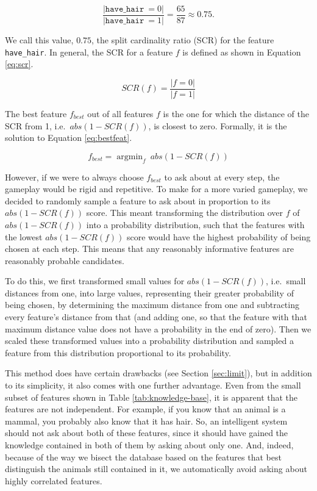 \documentclass[11pt,a4paper]{article}
\DeclareMathOperator*{\argmin}{argmin}
\newcommand{\havehair}{\texttt{have\_hair}}
\begin{document}
$$\frac{|\havehair\ = 0|}{|\havehair\ = 1|} = \frac{65}{87} \approx 0.75.$$

We call this value, $0.75$, the split cardinality ratio (SCR) for the feature \havehair.
In general, the SCR for a feature $f$ is defined as shown in Equation \ref{eq:scr}.

\begin{equation}
SCR(f) = \frac{|f = 0|}{|f = 1|} 
\label{eq:scr}
\end{equation}

The best feature $f_{best}$ out of all features $f$ is the one for which the distance of the SCR from 1, i.e.\ $abs(1 - SCR(f))$, is closest to zero.
Formally, it is the solution to Equation \ref{eq:bestfeat}.

\begin{equation}
f_{best} = \argmin_f\ abs(1 - SCR(f)) 
\label{eq:bestfeat}
\end{equation}

However, if we were to always choose $f_{best}$ to ask about at every step, the gameplay would be rigid and repetitive.
To make for a more varied gameplay, we decided to randomly sample a feature to ask about in proportion to its $abs(1 - SCR(f))$ score. 
This meant transforming the distribution over $f$ of $abs(1 - SCR(f))$ into a probability distribution, such that the features with the lowest $abs(1 - SCR(f))$ score would have the highest probability of being chosen at each step.
This means that any reasonably informative features are reasonably probable candidates.

To do this, we first transformed small values for $abs(1 - SCR(f))$, i.e.\ small distances from one, into large values, representing their greater probability of being chosen, by determining the maximum distance from one and subtracting every feature's distance from that (and adding one, so that the feature with that maximum distance value does not have a probability in the end of zero).
Then we scaled these transformed values into a probability distribution and sampled a feature from this distribution proportional to its probability.

This method does have certain drawbacks (see Section \ref{sec:limit}), but in addition to its simplicity, it also comes with one further advantage.
Even from the small subset of features shown in Table \ref{tab:knowledge-base}, it is apparent that the features are not independent.
For example, if you know that an animal is a mammal, you probably also know that it has hair.
So, an intelligent system should not ask about both of these features, since it should have gained the knowledge contained in both of them by asking about only one.
And, indeed, because of the way we bisect the database based on the features that best distinguish the animals still contained in it, we automatically avoid asking about highly correlated features.
\end{document}
